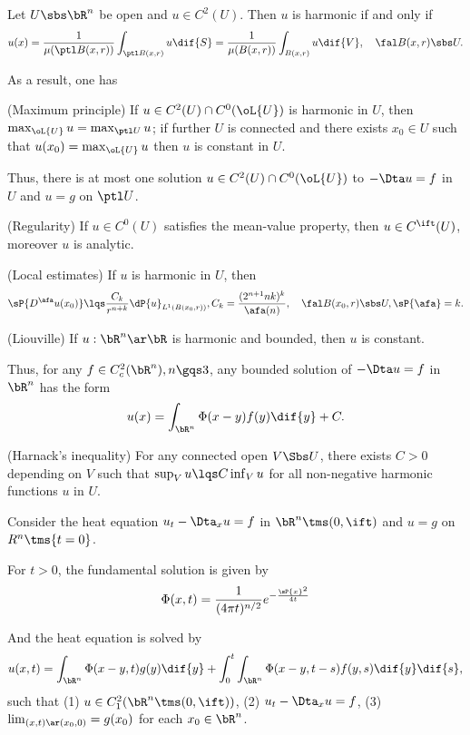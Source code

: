 \documentclass[a4paper, twoside]{article}
\begin{document}
\begin{thm}
    Let $U\sbs\bR^{n}$ be open and $u\in C^{2}(U)$. Then $u$ is harmonic if and only if
    \[
        u(x)=\frac{1}{\mu(\ptl B(x,r))}\int_{\ptl B(x,r)}u\dif{S}=\frac{1}{\mu(B(x,r))}\int_{B(x,r)}u\dif{V},\quad\fal B(x,r)\sbs U.
    \]

    As a result, one has
    \begin{itm}
        \item (Maximum principle) If $u\in C^{2}(U)\cap C^{0}(\oL{U})$ is harmonic in $U$, then $\max_{\oL{U}}u=\max_{\ptl U}u$; if further $U$ is connected and there exists $x_{0}\in U$ such that $u(x_{0})=\max_{\oL{U}}u$ then $u$ is constant in $U$.

        Thus, there is at most one solution $u\in C^{2}(U)\cap C^{0}(\oL{U})$ to $-\Dta u=f$ in $U$ and $u=g$ on $\ptl U$.

        \item (Regularity) If $u\in C^{0}(U)$ satisfies the mean-value property, then $u\in C^{\ift}(U)$, moreover $u$ is analytic.
        \item (Local estimates) If $u$ is harmonic in $U$, then
        \[
            \sP{D^{\afa}u(x_{0})}\lqs\frac{C_{k}}{r^{n+k}}\dP{u}_{L^{1}(B(x_{0},r))}, C_{k}=\frac{(2^{n+1}nk)^{k}}{\afa(n)},\quad \fal B(x_{0},r)\sbs U, \sP{\afa}=k.
        \]
        \item (Liouville) If $u:\bR^{n}\ar\bR$ is harmonic and bounded, then $u$ is constant.

        Thus, for any $f\in C_{c}^{2}(\bR^{n}),n\gqs3$, any bounded solution of $-\Dta u=f$ in $\bR^{n}$ has the form
        \[
            u(x)=\int_{\bR^{n}}\Phi(x-y)f(y)\dif{y} +C.
        \]
        \item (Harnack's inequality) For any connected open $V\Sbs U$, there exists $C>0$ depending on $V$ such that $\sup_{V}u\lqs C\inf_{V}u$ for all non-negative harmonic functions $u$ in $U$.
    \end{itm}
\end{thm}



\begin{thm}
    Consider the heat equation $u_{t}-\Dta_{x}u=f$ in $\bR^{n}\tms(0,\ift)$ and $u=g$ on $R^{n}\tms\{t=0\}$.

    For $t>0$, the fundamental solution is given by
    \[
        \Phi(x,t)=\frac{1}{(4\pi t)^{n/2}}e^{-\frac{\sP{x}^{2}}{4t}}
    \]

    And the heat equation is solved by
    \[
        u(x,t)=\int_{\bR^{n}}\Phi(x-y,t)g(y)\dif{y}+\int_{0}^{t}\int_{\bR^{n}}\Phi(x-y,t-s)f(y,s)\dif{y}\dif{s},
    \]
    such that (1) $u\in C_{1}^{2}(\bR^{n}\tms(0,\ift))$, (2) $u_{t}-\Dta_{x}u=f$, (3) $\lim_{(x,t)\ar(x_{0},0)}=g(x_{0})$ for each $x_{0}\in\bR^{n}$.
\end{thm}
\end{document}
